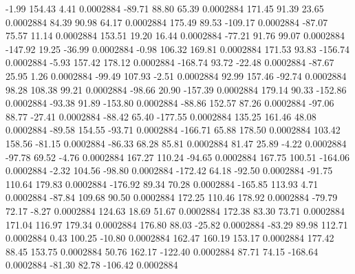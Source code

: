        -1.99      154.43        4.41     0.0002884
      -89.71       88.80       65.39     0.0002884
      171.45       91.39       23.65     0.0002884
       84.39       90.98       64.17     0.0002884
      175.49       89.53     -109.17     0.0002884
      -87.07       75.57       11.14     0.0002884
      153.51       19.20       16.44     0.0002884
      -77.21       91.76       99.07     0.0002884
     -147.92       19.25      -36.99     0.0002884
       -0.98      106.32      169.81     0.0002884
      171.53       93.83     -156.74     0.0002884
       -5.93      157.42      178.12     0.0002884
     -168.74       93.72      -22.48     0.0002884
      -87.67       25.95        1.26     0.0002884
      -99.49      107.93       -2.51     0.0002884
       92.99      157.46      -92.74     0.0002884
       98.28      108.38       99.21     0.0002884
      -98.66       20.90     -157.39     0.0002884
      179.14       90.33     -152.86     0.0002884
      -93.38       91.89     -153.80     0.0002884
      -88.86      152.57       87.26     0.0002884
      -97.06       88.77      -27.41     0.0002884
      -88.42       65.40     -177.55     0.0002884
      135.25      161.46       48.08     0.0002884
      -89.58      154.55      -93.71     0.0002884
     -166.71       65.88      178.50     0.0002884
      103.42      158.56      -81.15     0.0002884
      -86.33       68.28       85.81     0.0002884
       81.47       25.89       -4.22     0.0002884
      -97.78       69.52       -4.76     0.0002884
      167.27      110.24      -94.65     0.0002884
      167.75      100.51     -164.06     0.0002884
       -2.32      104.56      -98.80     0.0002884
     -172.42       64.18      -92.50     0.0002884
      -91.75      110.64      179.83     0.0002884
     -176.92       89.34       70.28     0.0002884
     -165.85      113.93        4.71     0.0002884
      -87.84      109.68       90.50     0.0002884
      172.25      110.46      178.92     0.0002884
      -79.79       72.17       -8.27     0.0002884
      124.63       18.69       51.67     0.0002884
      172.38       83.30       73.71     0.0002884
      171.04      116.97      179.34     0.0002884
      176.80       88.03      -25.82     0.0002884
      -83.29       89.98      112.71     0.0002884
        0.43      100.25      -10.80     0.0002884
      162.47      160.19      153.17     0.0002884
      177.42       88.45      153.75     0.0002884
       50.76      162.17     -122.40     0.0002884
       87.71       74.15     -168.64     0.0002884
      -81.30       82.78     -106.42     0.0002884
